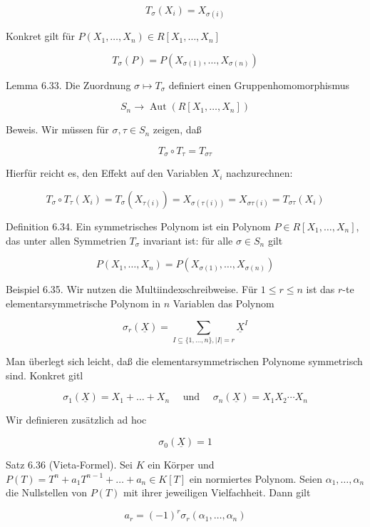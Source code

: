 \documentclass[10pt, letterpaper]{article}
\begin{document}
$$
T_{\sigma}\left(X_{i}\right)=X_{\sigma(i)}
$$

Konkret gilt für $P\left(X_{1}, \ldots, X_{n}\right) \in R\left[X_{1}, \ldots, X_{n}\right]$

$$
T_{\sigma}(P)=P\left(X_{\sigma(1)}, \ldots, X_{\sigma(n)}\right)
$$

Lemma 6.33. Die Zuordnung $\sigma \mapsto T_{\sigma}$ definiert einen Gruppenhomomorphismus

$$
S_{n} \rightarrow \operatorname{Aut}\left(R\left[X_{1}, \ldots, X_{n}\right]\right)
$$

Beweis. Wir müssen für $\sigma, \tau \in S_{n}$ zeigen, daß

$$
T_{\sigma} \circ T_{\tau}=T_{\sigma \tau}
$$

Hierfür reicht es, den Effekt auf den Variablen $X_{i}$ nachzurechnen:

$$
T_{\sigma} \circ T_{\tau}\left(X_{i}\right)=T_{\sigma}\left(X_{\tau(i)}\right)=X_{\sigma(\tau(i))}=X_{\sigma \tau(i)}=T_{\sigma \tau}\left(X_{i}\right)
$$

Definition 6.34. Ein symmetrisches Polynom ist ein Polynom $P \in R\left[X_{1}, \ldots, X_{n}\right]$, das unter allen Symmetrien $T_{\sigma}$ invariant ist: für alle $\sigma \in S_{n}$ gilt

$$
P\left(X_{1}, \ldots, X_{n}\right)=P\left(X_{\sigma(1)}, \ldots, X_{\sigma(n)}\right)
$$

Beispiel 6.35. Wir nutzen die Multiindexschreibweise. Für $1 \leq r \leq n$ ist das $r$-te elementarsymmetrische Polynom in $n$ Variablen das Polynom

$$
\sigma_{r}(\underline{X})=\sum_{I \subseteq\{1, \ldots, n\},|I|=r} \underline{X}^{I}
$$

Man überlegt sich leicht, daß die elementarsymmetrischen Polynome symmetrisch sind. Konkret gitl

$$
\sigma_{1}(\underline{X})=X_{1}+\ldots+X_{n} \quad \text { und } \quad \sigma_{n}(\underline{X})=X_{1} X_{2} \cdots X_{n}
$$

Wir definieren zusätzlich ad hoc

$$
\sigma_{0}(\underline{X})=1
$$

Satz 6.36 (Vieta-Formel). Sei $K$ ein Körper und $P(T)=T^{n}+a_{1} T^{n-1}+\ldots+a_{n} \in K[T]$ ein normiertes Polynom. Seien $\alpha_{1}, \ldots, \alpha_{n}$ die Nullstellen von $P(T)$ mit ihrer jeweiligen Vielfachheit. Dann gilt

$$
a_{r}=(-1)^{r} \sigma_{r}\left(\alpha_{1}, \ldots, \alpha_{n}\right)
$$
\end{document}
